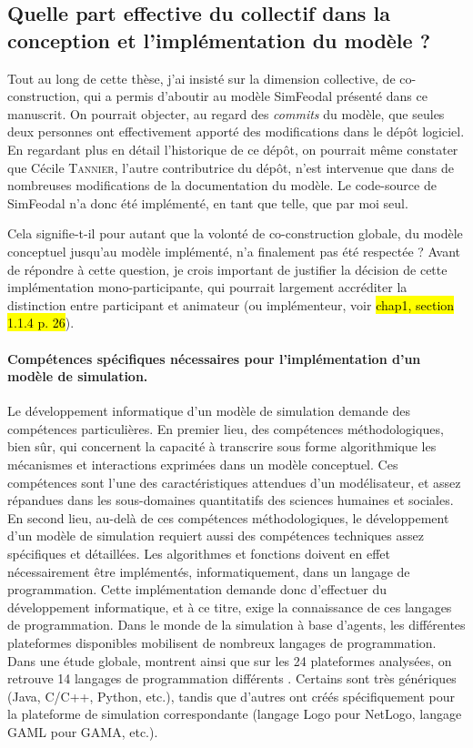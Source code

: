 \subsection{Quelle part effective du collectif dans la conception et l'implémentation du modèle ?}

Tout au long de cette thèse, j'ai insisté sur la dimension collective, de co-construction, qui a permis d'aboutir au modèle SimFeodal présenté dans ce manuscrit.
On pourrait objecter, au regard des \textit{commits} du modèle, que seules deux personnes ont effectivement apporté des modifications dans le dépôt logiciel.
En regardant plus en détail l'historique de ce dépôt, on pourrait même constater que Cécile \textsc{Tannier}, l'autre contributrice du dépôt, n'est intervenue \og que\fg{} dans de nombreuses modifications de la documentation du modèle.
Le code-source de SimFeodal n'a donc été implémenté, en tant que telle, que par moi seul.

Cela signifie-t-il pour autant que la volonté de co-construction globale, du modèle conceptuel jusqu'au modèle implémenté, n'a finalement pas été respectée ?
Avant de répondre à cette question, je crois important de justifier la décision de cette implémentation mono-participante, qui pourrait largement accréditer la distinction entre \og participant\fg{} et \og animateur\fg{} (ou \og implémenteur\fg{}, voir \hl{chap1, section 1.1.4 p. 26}).

\paragraph{Compétences spécifiques nécessaires pour l'implémentation d'un modèle de simulation.}
Le développement informatique d'un modèle de simulation demande des compétences particulières.
En premier lieu, des compétences méthodologiques, bien sûr, qui concernent la capacité à transcrire sous forme algorithmique les mécanismes et interactions exprimées dans un modèle conceptuel.
Ces compétences sont l'une des caractéristiques attendues d'un \og modélisateur\fg{}, et assez répandues dans les sous-domaines quantitatifs des sciences humaines et sociales.
En second lieu, au-delà de ces compétences méthodologiques, le développement d'un modèle de simulation requiert aussi des compétences techniques assez spécifiques et détaillées.
Les algorithmes et fonctions doivent en effet nécessairement être \og implémentés\fg{}, informatiquement, dans un langage de programmation.
Cette implémentation demande donc d'effectuer du \og développement informatique\fg{}, et à ce titre, exige la connaissance de ces langages de programmation.
Dans le monde de la simulation à base d'agents, les différentes plateformes disponibles mobilisent de nombreux langages de programmation.
Dans une étude globale, \textcite{kravari_survey_2015} montrent ainsi que sur les 24 plateformes analysées, on retrouve 14 langages de programmation différents \autocite[table 7, \S 4.3]{kravari_survey_2015}.
Certains sont très génériques (Java, C/C++, Python, etc.), tandis que d'autres ont créés spécifiquement pour la plateforme de simulation correspondante (langage Logo pour NetLogo, langage GAML pour GAMA, etc.).

